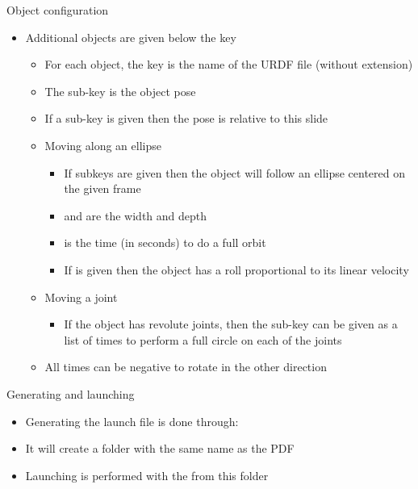 \documentclass{ecnbeamer}
\begin{document}
\begin{frame}{Object configuration}
\begin{itemize}
 \item Additional objects are given below the  key
 \begin{itemize}
  \item For each object, the key is the name of the URDF file (without extension)
  \item The  sub-key is the object pose
  \item If a  sub-key is given then the pose is relative to this slide\vfill
  \item Moving along an ellipse
  \begin{itemize}
   \item If subkeys  are given then the object will follow an ellipse centered on the given frame
   \item {} and  are the width and depth 
   \item {} is the time (in seconds) to do a full orbit
   \item If  is given then the object has a roll proportional to its linear velocity
  \end{itemize}\vfill
  \item Moving a joint
  \begin{itemize}
   \item If the object has revolute joints, then the  sub-key can be given as a list of times to perform a full circle on each of the joints 
  \end{itemize}\vfill
  \item All times can be negative to rotate in the other direction
 \end{itemize}
\end{itemize}
\end{frame}

\begin{frame}{Generating and launching}
 \begin{itemize}
  \item Generating the launch file is done through:\\
  \vfill
  \item It will create a folder with the same name as the PDF\vfill
  \item Launching is performed with the  from this folder\\
  
 \end{itemize}

\end{frame}
\end{document}
